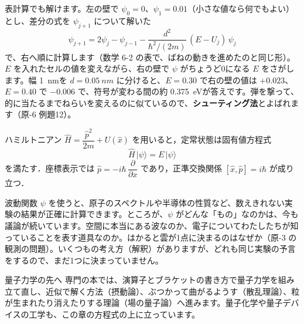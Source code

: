 表計算でも解けます。左の壁で $\psi_0=0$、$\psi_1=0.01$（小さな値なら何でもよい）とし、差分の式を $\psi_{j+1}$ について解いた
\[\psi_{j+1}=2\psi_j-\psi_{j-1}-\frac{d^2}{\hbar^2/(2m)}\,(E-U_j)\,\psi_j\]
で、右へ順に計算します（数学 6-2 の表で、ばねの動きを進めたのと同じ形）。$E$ を入れたセルの値を変えながら、右の壁で $\psi$ がちょうど0になる $E$ をさがします。幅 \qty{1}{nm}を $d=\qty{0.05}{nm}$ に分けると、$E=0.30$ で右の壁の値は $+0.023$、$E=0.40$ で $-0.006$ で、符号が変わる間の約 \qty{0.375}{eV}が答えです。弾を撃って、的に当たるまでねらいを変えるのに似ているので、\textbf{シューティング法}とよばれます（原-6 例題12）。

\begin{senmonsho}[量子力学の専門書の書き方]
\begin{bkhonbun}
ハミルトニアン $\hat H=\dfrac{\hat p^2}{2m}+U(\hat x)$ を用いると，定常状態は固有値方程式
\[ \hat H\,|\psi\rangle=E\,|\psi\rangle \]
を満たす．座標表示では $\hat p=-i\hbar\,\dfrac{\partial}{\partial x}$ であり，正準交換関係 $[\hat x,\hat p]=i\hbar$ が成り立つ．
\end{bkhonbun}
\end{senmonsho}

\begin{phmada}
波動関数 $\psi$ を使うと、原子のスペクトルや半導体の性質など、数えきれない実験の結果が正確に計算できます。ところが、$\psi$ がどんな「もの」なのかは、今も議論が続いています。空間に本当にある波なのか、電子についてわたしたちが知っていることを表す道具なのか。はかると雲が1点に決まるのはなぜか（原-3 の観測の問題）。いくつもの考え方（解釈）がありますが、どれも同じ実験の予言をするので、まだ1つに決まっていません。
\end{phmada}

\begin{phsaki}{量子力学の先へ}
専門の本では、演算子とブラケットの書き方で量子力学を組み立て直し、近似で解く方法（摂動論）、ぶつかって曲がるようす（散乱理論）、粒が生まれたり消えたりする理論（場の量子論）へ進みます。量子化学や量子デバイスの工学も、この章の方程式の上に立っています。
\end{phsaki}

